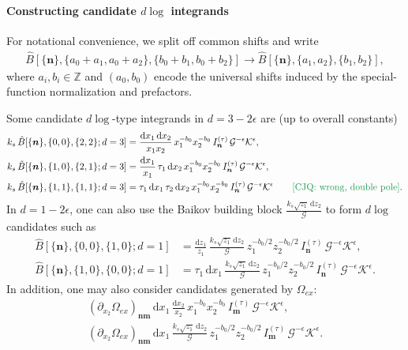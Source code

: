 \documentclass[a4paper,12pt]{article}
\newcommand{\n}{\nonumber}
\def\di{{\mathrm{d}}}
\def\ep{\epsilon}
\newcommand{\mG}{\mathcal{G}}
\newcommand{\mK}{\mathcal{K}}
\def\to{\rightarrow}
\newcommand{\cjq}[1]{{\color[rgb]{.1,.6,.3}{[{CJQ:} #1]}}}
\begin{document}
\paragraph{Constructing candidate $d\log$ integrands}
For notational convenience, we split off common shifts and write
\begin{align}
	\hat{B}[\{\bm n\},\{a_0+a_1,a_0+a_2\},\{b_0+b_1,b_0+b_2\}]\to \hat{B}[\{\bm n\},\{a_1,a_2\},\{b_1,b_2\}],
\end{align}
where $a_i,b_i\in\mathbb Z$ and $(a_0,b_0)$ encode the universal shifts induced by the special-function normalization and prefactors.

Some candidate $d\log$-type integrands in $d=3-2\ep$ are (up to overall constants)
\begin{align}
	k_s\,\hat{B}[\{\bm n\},\{0,0\},\{2,2\};d=3]
	&= \frac{\di x_1\,\di x_2}{x_1 x_2}\,x_1^{-b_0}x_2^{-b_0}\,I^{(\tau)}_{\bm n}\,\mG^{-\ep}\mK^{\ep}, \n\\
	k_s\,\hat{B}[\{\bm n\},\{1,0\},\{2,1\};d=3]
	&= \frac{\di x_1}{x_1}\,\tau_1\,\di x_2\,x_1^{-b_0}x_2^{-b_0}\,I^{(\tau)}_{\bm n}\,\mG^{-\ep}\mK^{\ep}, \n\\
	k_s\,\hat{B}[\{\bm n\},\{1,1\},\{1,1\};d=3]
	&= \tau_1\,\di x_1\,\tau_2\,\di x_2\,x_1^{-b_0}x_2^{-b_0}\,I^{(\tau)}_{\bm n}\,\mG^{-\ep}\mK^{\ep}\qquad \text{\cjq{wrong, double pole}}.
\end{align}
In $d=1-2\ep$, one can also use the Baikov building block $\frac{k_s\sqrt{z_1}\,\di z_2}{\mG}$ to form $d\log$ candidates such as
\begin{align}
	\hat{B}[\{\bm n\},\{0,0\},\{1,0\};d=1]
	&= \frac{\di z_1}{z_1}\,\frac{k_s\sqrt{z_1}\,\di z_2}{\mG}\,
	z_1^{-b_0/2}z_2^{-b_0/2}\,I^{(\tau)}_{\bm n}\,\mG^{-\ep}\mK^{\ep}, \n\\
	\hat{B}[\{\bm n\},\{1,0\},\{0,0\};d=1]
	&= \tau_1\,\di x_1\,\frac{k_s\sqrt{z_1}\,\di z_2}{\mG}\,
	z_1^{-b_0/2}z_2^{-b_0/2}\,I^{(\tau)}_{\bm n}\,\mG^{-\ep}\mK^{\ep}.
\end{align}
In addition, one may also consider candidates generated by $\Omega_{ex}$:
\begin{align}
	(\partial_{x_2}\Omega_{ex})_{\bm n \bm m}\,\di x_1\,\frac{\di x_2}{x_2}\,
	x_1^{-b_0}x_2^{-b_0}\,I^{(\tau)}_{\bm m}\,\mG^{-\ep}\mK^{\ep}, \n\\
	(\partial_{x_2}\Omega_{ex})_{\bm n \bm m}\,\di x_1\,\frac{k_s\sqrt{z_1}\,\di z_2}{\mG}\,
	z_1^{-b_0/2}z_2^{-b_0/2}\,I^{(\tau)}_{\bm m}\,\mG^{-\ep}\mK^{\ep}.
\end{align}
\end{document}
